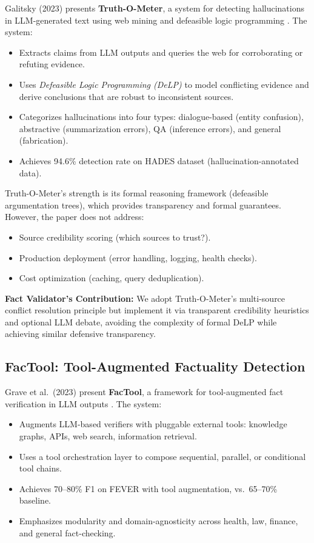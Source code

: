 \documentclass[12pt,a4paper,twoside]{article}
\begin{document}
Galitsky (2023) presents \textbf{Truth-O-Meter}, a system for detecting hallucinations in LLM-generated text using web mining and defeasible logic programming \cite{galitsky2023truth}. The system:

\begin{itemize}
    \item Extracts claims from LLM outputs and queries the web for corroborating or refuting evidence.
    \item Uses \textit{Defeasible Logic Programming (DeLP)} to model conflicting evidence and derive conclusions that are robust to inconsistent sources.
    \item Categorizes hallucinations into four types: dialogue-based (entity confusion), abstractive (summarization errors), QA (inference errors), and general (fabrication).
    \item Achieves 94.6\% detection rate on HADES dataset (hallucination-annotated data).
\end{itemize}

Truth-O-Meter's strength is its formal reasoning framework (defeasible argumentation trees), which provides transparency and formal guarantees. However, the paper does not address:
\begin{itemize}
    \item Source credibility scoring (which sources to trust?).
    \item Production deployment (error handling, logging, health checks).
    \item Cost optimization (caching, query deduplication).
\end{itemize}

\textbf{Fact Validator's Contribution:} We adopt Truth-O-Meter's multi-source conflict resolution principle but implement it via transparent credibility heuristics and optional LLM debate, avoiding the complexity of formal DeLP while achieving similar defensive transparency.

\subsection{FacTool: Tool-Augmented Factuality Detection}

Grave et al.\ (2023) present \textbf{FacTool}, a framework for tool-augmented fact verification in LLM outputs \cite{grave2020factool}. The system:

\begin{itemize}
    \item Augments LLM-based verifiers with pluggable external tools: knowledge graphs, APIs, web search, information retrieval.
    \item Uses a tool orchestration layer to compose sequential, parallel, or conditional tool chains.
    \item Achieves 70--80\% F1 on FEVER with tool augmentation, vs.\ 65--70\% baseline.
    \item Emphasizes modularity and domain-agnosticity across health, law, finance, and general fact-checking.
\end{itemize}
\end{document}
